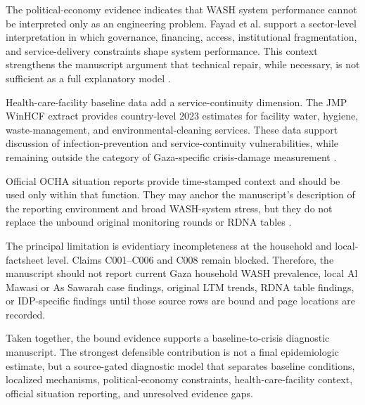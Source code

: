The political-economy evidence indicates that WASH system performance cannot be interpreted only as an engineering problem. Fayad et al. support a sector-level interpretation in which governance, financing, access, institutional fragmentation, and service-delivery constraints shape system performance. This context strengthens the manuscript argument that technical repair, while necessary, is not sufficient as a full explanatory model \citep{fayad_2025}.

Health-care-facility baseline data add a service-continuity dimension. The JMP WinHCF extract provides country-level 2023 estimates for facility water, hygiene, waste-management, and environmental-cleaning services. These data support discussion of infection-prevention and service-continuity vulnerabilities, while remaining outside the category of Gaza-specific crisis-damage measurement \citep{jmp_winhcf_pse_2024}.

Official OCHA situation reports provide time-stamped context and should be used only within that function. They may anchor the manuscript's description of the reporting environment and broad WASH-system stress, but they do not replace the unbound original monitoring rounds or RDNA tables \citep{ocha_2026_apr17,ocha_2026_may15,wash_cluster_palestine_2026}.

The principal limitation is evidentiary incompleteness at the household and local-factsheet level. Claims C001--C006 and C008 remain blocked. Therefore, the manuscript should not report current Gaza household WASH prevalence, local Al Mawasi or As Sawarah case findings, original LTM trends, RDNA table findings, or IDP-specific findings until those source rows are bound and page locations are recorded.

Taken together, the bound evidence supports a baseline-to-crisis diagnostic manuscript. The strongest defensible contribution is not a final epidemiologic estimate, but a source-gated diagnostic model that separates baseline conditions, localized mechanisms, political-economy constraints, health-care-facility context, official situation reporting, and unresolved evidence gaps.

